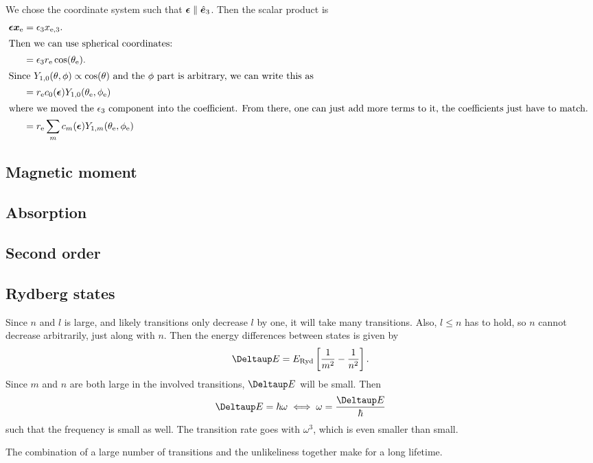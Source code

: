 \documentclass[11pt, english, fleqn, DIV=15, headinclude, BCOR=1.5cm]{scrartcl}
\begin{document}
We chose the coordinate system such that $\boldsymbol{\epsilon} \parallel \hat{\boldsymbol{e}}_3$. Then
the scalar product is
\begin{align*}
    \vec \epsilon \vec x_\text{e}
    &= \epsilon_3 x_{\text e, 3}. \\
    \intertext{%
        Then we can use spherical coordinates:
    }
    &= \epsilon_3 r_\text e \cos(\theta_\text e). \\
    \intertext{%
        Since $Y_{1,0}(\theta, \phi) \propto \cos(\theta)$ and the $\phi$ part
        is arbitrary, we can write this as
    }
    &= r_\text e c_0(\vec \epsilon) Y_{1,0}(\theta_\text e, \phi_\text e) \\
    \intertext{%
        where we moved the $\epsilon_3$ component into the coefficient. From
        there, one can just add more terms to it, the coefficients just have to
        match.
    }
    &= r_\text e \sum_m c_m(\vec \epsilon) Y_{1,m}(\theta_\text e, \phi_\text e)
\end{align*}

\subsection{Magnetic moment}
\subsection{Absorption}
\subsection{Second order}
\subsection{Rydberg states}

Since $n$ and $l$ is large, and likely transitions only decrease $l$ by one, it
will take many transitions. Also, $l \leq n$ has to hold, so $n$ cannot
decrease arbitrarily, just along with $n$. Then the energy differences between
states is given by
\[
    \Deltaup E = E_\text{Ryd} \sbr{\frac{1}{m^2} - \frac1{n^2}}.
\]
Since $m$ and $n$ are both large in the involved transitions, $\Deltaup E$ will
be small. Then
\[
    \Deltaup E = \hbar \omega
    \iff
    \omega = \frac{\Deltaup E}{\hbar}
\]
such that the frequency is small as well. The transition rate goes with
$\omega^3$, which is even smaller than small.

The combination of a large number of transitions and the unlikeliness together
make for a long lifetime.
\end{document}
